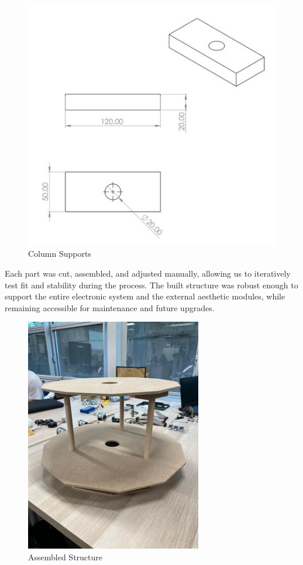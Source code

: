\begin{figure}[H]
    \centering
    \includegraphics[width=0.6\linewidth]{../ReportMovementModule/images/Aspose.Words.728084da-df58-4b9d-a372-f65cffbdb23d.022.jpeg}
    \caption{Column Supports}
\end{figure}

Each part was cut, assembled, and adjusted manually, allowing us to iteratively test fit and stability during the process. The built structure was robust enough to support the entire electronic system and the external aesthetic modules, while remaining accessible for maintenance and future upgrades.

\begin{figure}[H]
    \centering
    \includegraphics[width=0.6\linewidth]{../ReportMovementModule/images/Aspose.Words.728084da-df58-4b9d-a372-f65cffbdb23d.023.jpeg}
    \caption{Assembled Structure}
\end{figure}

